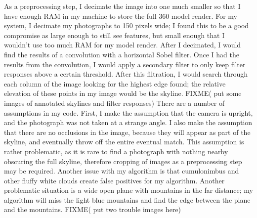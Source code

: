 \documentclass{acm_proc_article-sp}
\begin{document}
As a preprocessing step, I decimate the image into one much smaller so that I have enough RAM in my machine to store the full 360 model render.  For my system, I decimate my photographs to 150 pixels wide; I found this to be a good compromise as large enough to still see features, but small enough that I wouldn’t use too much RAM for my model render. After I decimated, I would find the results of a convolution with a horizontal Sobel filter. Once I had the results from the convolution, I would apply a secondary filter to only keep filter responses above a certain threshold.  After this filtration, I would search through each column of the image looking for the highest edge found; the relative elevation of these points in my image would be the skyline.  FIXME( put some images of annotated skylines and filter responses)
    There are a number of assumptions in my code.  First, I make the assumption that the camera is upright, and the photograph was not taken at a strange angle.  I also make the assumption that there are no occlusions in the image, because they will appear as part of the skyline, and eventually throw off the entire eventual match.  This assumption is rather problematic, as it is rare to find a photograph with nothing nearby obscuring the full skyline, therefore cropping of images as a preprocessing step may be required.  Another issue with my algorithm is that cumulonimbus and other fluffy white clouds create false positives for my algorithm.   Another problematic situation is a wide open plane with mountains in the far distance; my algorithm will miss the light blue mountains and find the edge between the plane and the mountains.  FIXME( put two trouble images here)
    
\end{document}

